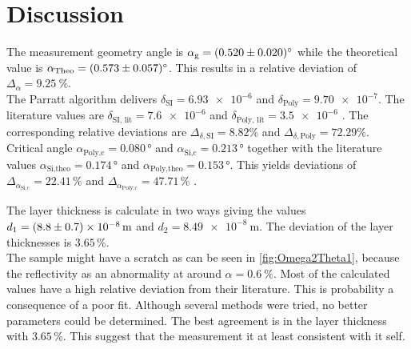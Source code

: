\section{Discussion}
\label{sec:Diskussion}


The measurement geometry angle is $\alpha_\text{g} = \SI{0.520 \pm 0.020}{\degree}$ while the theoretical value is $\alpha_\text{Theo}  = \SI{0.573 \pm 0.057}{\degree}$.
This results in a relative deviation of $\Delta_\alpha = \SI{9.25}{\%}$.\\
The Parratt algorithm delivers $\delta_{\text{SI}}   =  \num{6.93e-6}$ and $\delta_\text{Poly}  =  \num{9.70e-7}$.
The literature values are $\delta_{\text{SI, lit}} = \num{7.6e-6}$ and $\delta_{\text{Poly, lit}} = \num{3.5e-6}$ \cite{v44}.
The corresponding relative deviations are $\Delta_{\delta, \text{SI}} = \num{8.82}{\%}$ and $\Delta_{\delta, \text{Poly}} = \num{72.29}{\%}$.\\
Critical angle $\alpha_{\text{Poly}, \text{c}} = 0.080 \, \unit{\degree}$ and $\alpha_{\text{Si}, \text{c}} = 0.213\, \unit{\degree}$ together with the literature values 
$\alpha_{\text{Si}, \text{theo}} = 0.174 \, \unit{\degree}$ and $\alpha_{\text{Poly}, \text{theo}} = 0.153 \, \unit{\degree}$.
This yields deviations of $\Delta_{\alpha_{\text{Si}, \text{c}}} = 22.41\,\%$ and $\Delta_{\alpha_{\text{Poly}, \text{c}}} = 47.71\,\%$ .


The layer thickness is calculate in two ways giving the values $d_1 = \SI{8.8 \pm 0.7e-08}{\meter}$ and $d_2 = \SI{8.49e-8}{\meter}$.
The deviation of the layer thicknesses is $3.65\, \%$.\\

The sample might have a scratch as can be seen in \autoref{fig:Omega2Theta1}, because the reflectivity as an abnormality at around $\alpha = \SI{0.6}{\%}$.
Most of the calculated values have a high relative deviation from their literature. This is probability a consequence of a poor fit.
Although several methods were tried, no better parameters could be determined. The best agreement is in the layer thickness with $3.65\, \%$.
This suggest that the measurement it at least consistent with it self.
